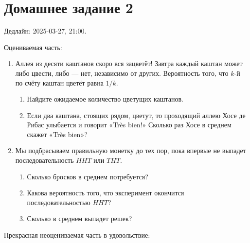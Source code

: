 \documentclass[12pt]{article}
\begin{document}
\section*{Домашнее задание 2}

Дедлайн: 2025-03-27, 21:00.

Оцениваемая часть:

\begin{enumerate}
\item Аллея из десяти каштанов скоро вся зацветёт!
Завтра каждый каштан может либо цвести, либо — нет, независимо от других.
Вероятность того, что $k$-й по счёту каштан цветёт равна $1/k$. 

\begin{enumerate}
    \item Найдите ожидаемое количество цветущих каштанов. 
    \item Если два каштана, стоящих рядом, цветут, то проходящий аллею Хосе де Рибас улыбается и говорит «Très bien!»
    Сколько раз Хосе в среднем скажет «Très bien»?     
\end{enumerate}

\item Мы подбрасываем правильную монетку до тех пор, пока впервые не выпадет последовательность $HHT$ или $THT$.
\begin{enumerate}
    \item Сколько бросков в среднем потребуется?
    \item Какова вероятность того, что эксперимент окончится последовательностью $HHT$?
    \item Сколько в среднем выпадет решек?
\end{enumerate}

\end{enumerate}

Прекрасная неоцениваемая часть в удовольствие:
\end{document}
